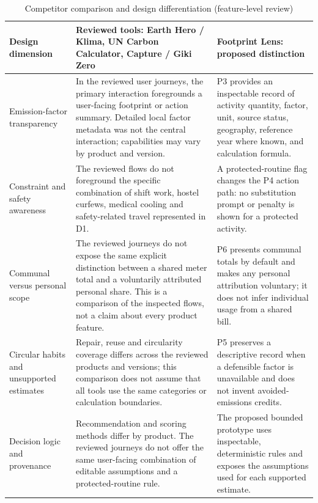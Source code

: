 \documentclass[12pt,a4paper]{article}
\begin{document}
\begin{table}[ht]
\centering
\footnotesize
\caption{Competitor comparison and design differentiation (feature-level review)}
\label{tab:competitor}
\begin{tabularx}{\textwidth}{@{}>{\raggedright\arraybackslash}p{2.7cm}>{\raggedright\arraybackslash}X>{\raggedright\arraybackslash}X@{}}
\toprule
\textbf{Design dimension} & \textbf{Reviewed tools: Earth Hero / Klima, UN Carbon Calculator, Capture / Giki Zero} & \textbf{Footprint Lens: proposed distinction}\\
\midrule
Emission-factor transparency &
In the reviewed user journeys, the primary interaction foregrounds a user-facing footprint or action summary. Detailed local factor metadata was not the central interaction; capabilities may vary by product and version. &
P3 provides an inspectable record of activity quantity, factor, unit, source status, geography, reference year where known, and calculation formula.\\
\rowcolor{RowGray}
Constraint and safety awareness &
The reviewed flows do not foreground the specific combination of shift work, hostel curfews, medical cooling and safety-related travel represented in D1. &
A protected-routine flag changes the P4 action path: no substitution prompt or penalty is shown for a protected activity.\\
Communal versus personal scope &
The reviewed journeys do not expose the same explicit distinction between a shared meter total and a voluntarily attributed personal share. This is a comparison of the inspected flows, not a claim about every product feature. &
P6 presents communal totals by default and makes any personal attribution voluntary; it does not infer individual usage from a shared bill.\\
\rowcolor{RowGray}
Circular habits and unsupported estimates &
Repair, reuse and circularity coverage differs across the reviewed products and versions; this comparison does not assume that all tools use the same categories or calculation boundaries. &
P5 preserves a descriptive record when a defensible factor is unavailable and does not invent avoided-emissions credits.\\
Decision logic and provenance &
Recommendation and scoring methods differ by product. The reviewed journeys do not offer the same user-facing combination of editable assumptions and a protected-routine rule. &
The proposed bounded prototype uses inspectable, deterministic rules and exposes the assumptions used for each supported estimate.\\
\bottomrule
\end{tabularx}
\end{table}
\end{document}

